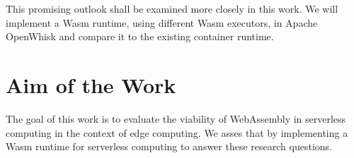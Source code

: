 
This promising outlook shall be examined more closely in this work. We will implement a Wasm runtime, using different Wasm executors, in Apache OpenWhisk and compare it to the existing container runtime.

\section{Aim of the Work}

The goal of this work is to evaluate the viability of WebAssembly in serverless computing in the context of edge computing. We asses that by implementing a Wasm runtime for serverless computing to answer these research questions.

